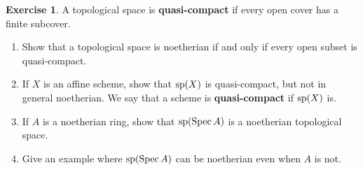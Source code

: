 \documentclass[]{pcmi}
\theoremstyle{plain}
\theoremstyle{definition}
\newtheorem{Exercise}{Exercise}
\theoremstyle{remark}
\begin{document}
\begin{Exercise}
    A topological space is \textbf{quasi-compact} if every open cover has a finite subcover. 
    \begin{enumerate}[label = (\alph*)]
        \item Show that a topological space is noetherian if and only if every open subset is quasi-compact. 
        \item If $X$ is an affine scheme, show that $\operatorname{sp} (X)$ is quasi-compact, but not in general noetherian. We say that a scheme is \textbf{quasi-compact} if $\operatorname{sp}(X)$ is. 
        \item If $A$ is a noetherian ring, show that $\operatorname{sp} (\operatorname{Spec} A)$ is a noetherian topological space. 
        \item Give an example where $\operatorname{sp} (\operatorname{Spec} A)$ can be noetherian even when $A$ is not. 
    \end{enumerate}
\end{Exercise}
\end{document}
